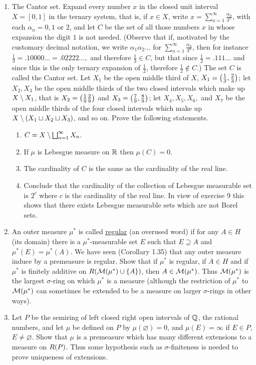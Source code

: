 \begin{enumerate}[label=\arabic*)]
\item The Cantor set. Expand every number $x$ in the closed unit interval $X=[0,1]$ in the ternary system, that is, if $x\in X$, write $x=\sum_{n=1}^\infty\frac{\alpha_n}{3^n}$, with each $\alpha_n=0,1$ or $2$, and let $C$ be the set of all those numbers $x$ in whose expansion the digit $1$ is not needed. (Observe that if, motivated by the customary decimal notation, we write $\alpha_1\alpha_2\dots$ for $\sum_{n=1}^\infty\frac{\alpha_n}{3^n}$, then for instance $\frac13=.10000\dots=.02222\dots,$ and therefore $\frac13\in C$, but that since $\frac12=.111\dots$ and since this is the only ternary expansion of $\frac12$, therefore $\frac12\notin C$.) The set $C$ is called the Cantor set. Let $X_1$ be the open middle third of $X$, $X_1=\left(\frac13,\frac23\right)$; let $X_2,X_3$ be the open middle thirds of the two closed intervals which make up $X\setminus X_1$, that is $X_2=\left(\frac19\frac29\right)$ and $X_3=\left(\frac79,\frac89\right)$; let $X_4,X_5,X_6,$ and $X_7$ be the open middle thirds of the four closed intervals which make up $X\setminus(X_1\sqcup X_2\sqcup X_3)$, and so on. Prove the following statements.
\begin{enumerate}
\item $C=X\setminus\bigsqcup_{n=1}^\infty X_n$.
\item If $\mu$ is Lebesgue measure on $\mathbb{R}$ then $\mu(C)=0$.
\item The cardinality of $C$ is the same as the cardinality of the real line.
\item Conclude that the cardinality of the collection of Lebesgue measurable set is $2^c$ where $c$ is the cardinality of the real line. In view of exercise 9 this shows that there exists Lebesgue measurable sets which are not Borel sets.
\end{enumerate}

\item An outer measure $\mu^*$ is called \underline{regular} (an overused word) if for any $A\in H$ (its domain) there is a $\mu^*$-measurable set $E$ such that $E\supseteq A$ and $\mu^*(E)=\mu^*(A)$. We have seen (Corollary 1.35) that any outer measure induce by a premeasure is regular. Show that if $\mu^*$ is regular, if $A\in H$ and if $\mu^*$ is finitely additive on $R({\cal M}(\mu^*)\cup\left\{A\right\})$, then $A\in{\cal M}(\mu^*)$. Thus ${\cal M}(\mu^*)$ is the largest $\sigma$-ring on which $\mu^*$ is a measure (although the restriction of $\mu^*$ to ${\cal M}(\mu^*)$ can sometimes be extended to be a measure on larger $\sigma$-rings in other ways).

\item Let $P$ be the semiring of left closed right open intervals of $\mathbb{Q}$, the rational numbers, and let $\mu$ be defined on $P$ by $\mu(\varnothing)=0$, and $\mu(E)=\infty$ if $E\in P$, $E\neq\varnothing$. Show that $\mu$ is a premeasure which has many different extensions to a measure on $R(P)$. Thus some hypothesis such as $\sigma$-finiteness is needed to prove uniqueness of extensions.


\end{enumerate}
